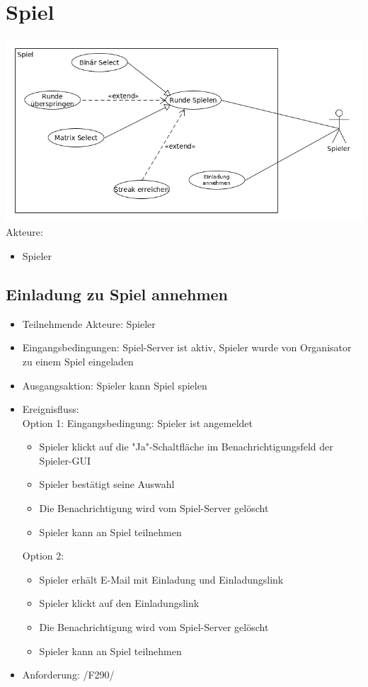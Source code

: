 \documentclass[a4paper]{scrreprt}
\begin{document}
    \section{Spiel}
    \includegraphics[width=\textwidth]{uml/export/Spiel.png}
    Akteure: 
    \begin{itemize}
    \item \Gls{Spieler}
    \end{itemize}

    \subsection{Einladung zu Spiel annehmen}
    \begin{itemize}
        \item Teilnehmende Akteure: \Gls{Spieler}

        \item Eingangsbedingungen: \Gls{Spiel-Server} ist aktiv, Spieler wurde von \Gls{Organisator} zu einem Spiel eingeladen
        \item Ausgangsaktion: \Gls{Spieler} kann \Gls{Spiel} spielen
        \item Ereignisfluss:\\
        Option 1: 
        Eingangsbedingung: \Gls{Spieler} ist angemeldet
        \begin{itemize}
            \item \Gls{Spieler} klickt auf die "Ja"-Schaltfläche im Benachrichtigungsfeld der Spieler-GUI
            \item \Gls{Spieler} bestätigt seine Auswahl
            \item Die Benachrichtigung wird vom \Gls{Spiel-Server} gelöscht
            \item \Gls{Spieler} kann an \Gls{Spiel} teilnehmen
        \end{itemize}
        Option 2: 
        \begin{itemize}
            \item \Gls{Spieler} erhält E-Mail mit Einladung und Einladungslink
            \item \Gls{Spieler} klickt auf den Einladungslink
            \item Die Benachrichtigung wird vom \Gls{Spiel-Server} gelöscht
            \item \Gls{Spieler} kann an \Gls{Spiel} teilnehmen
        \end{itemize}

        \item Anforderung: /F290/
    \end{itemize}
\end{document}
